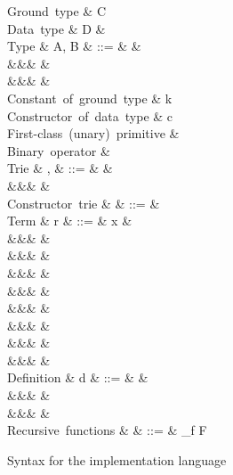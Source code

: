 \begin{figure}
\begin{syntaxfig}
\mbox{Ground type}
&
C
\\[1mm]
\mbox{Data type}
&
D
&
\\[1mm]
\mbox{Type}
&
A, B
&
::=
&
&
\\
&&&
&
\\
&&&
&
\\[1mm]
\mbox{Constant of ground type}
&
k
\\[1mm]
\mbox{Constructor of data type}
&
c
\\[1mm]
\mbox{First-class (unary) primitive}
&
\phi
\\[1mm]
\mbox{Binary operator}
&
\primOp
\\[1mm]
\mbox{Trie}
&
\sigma, \tau
&
::=
&
&
\\
&&&
\trieConstr{\Sigma}
&
\\[1mm]
\mbox{Constructor trie}
&
\Sigma
&
::=
&
\\[1mm]
\mbox{Term}
&
r
&
::=
&
x
&
\\
&&&
&
\\
&&&
\phi
&
\\
&&&
\exFun{\sigma}
&
\\
&&&
&
\\
&&&
&
\\
&&&
&
\\
&&&
&
\\
&&&
&
\\[1mm]
\mbox{Definition}
&
d
&
::=
&
&
\\
&&&
\exLetrecDef{\delta}
&
\\
&&&
&
\\[1mm]
\mbox{Recursive functions}
&
\delta
&
::=
&
_{f \in F}
\end{syntaxfig}
\caption{Syntax for the implementation language}
\label{fig:impl-language:syntax}
\end{figure}
